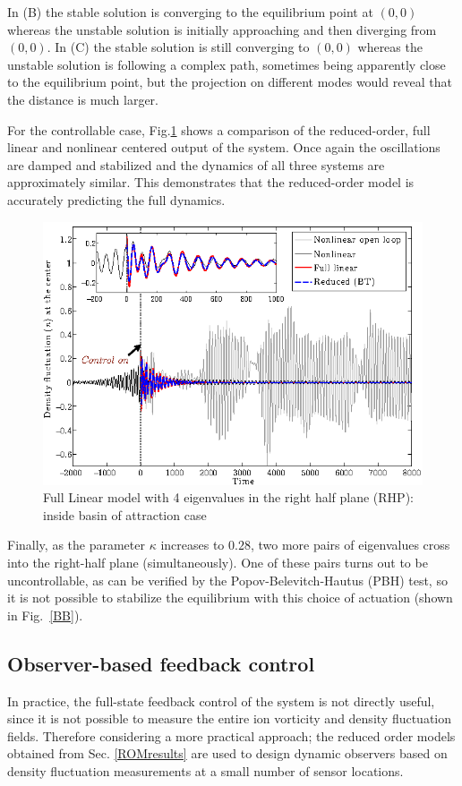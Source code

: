 \documentclass[12pt,lot, lof]{puthesis}
\begin{document}
In (B) the stable solution is converging to the equilibrium point at $(0,0)$ whereas the unstable solution is initially approaching and then diverging from $(0,0)$.
In (C) the stable solution is still converging to $(0,0)$ whereas the unstable solution is following a complex path, sometimes being apparently close to the equilibrium point, but the projection on different modes would reveal that the distance is much larger.

For the controllable case, Fig.\ref{lqr6} shows a comparison of the reduced-order, full linear and nonlinear centered output of the system. Once again the oscillations are damped and stabilized and the dynamics of all three systems are approximately similar. This demonstrates that the reduced-order model is accurately predicting the full dynamics.
\begin{figure}[htb]
\centering
  \includegraphics[width=0.7 \linewidth]{fullstate6}
  \caption{Full Linear model with 4 eigenvalues in the right half plane (RHP): inside basin of attraction case}
  \label{lqr6}
\end{figure}

Finally, as the parameter $\kappa$ increases to $0.28$, two more pairs of eigenvalues cross into the right-half plane (simultaneously).  One of these pairs turns out to be uncontrollable, as can be verified by the Popov-Belevitch-Hautus (PBH) test, \cite{Skogestad} so it is not possible to stabilize the equilibrium with this choice of actuation (shown in Fig.~\ref{BB}). 

\subsection{Observer-based feedback control}
In practice, the full-state feedback control of the system is not directly useful, since it is not possible to measure the entire ion vorticity and density fluctuation fields.
 Therefore considering a more practical approach; the reduced order models obtained from Sec. \ref{ROMresults} are used to design dynamic observers based on density fluctuation measurements at a small number of sensor locations. 
 
\end{document}
